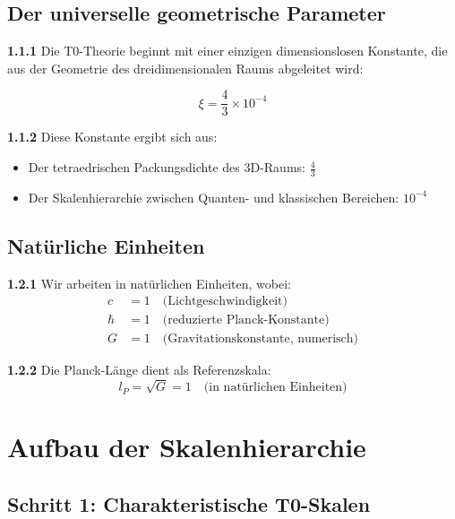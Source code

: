 \documentclass[12pt,a4paper]{article}
\newcommand{\lP}{l_P}
\newcommand{\xipar}{\xi}
\begin{document}
	\subsection{Der universelle geometrische Parameter}
	
	\noindent \textbf{1.1.1} Die T0-Theorie beginnt mit einer einzigen dimensionslosen Konstante, die aus der Geometrie des dreidimensionalen Raums abgeleitet wird:
	
	\begin{keyresult}
		\begin{equation}
			\boxed{\xipar = \frac{4}{3} \times 10^{-4}}
		\end{equation}
	\end{keyresult}
	
	\noindent \textbf{1.1.2} Diese Konstante ergibt sich aus:
	\begin{itemize}
		\item Der tetraedrischen Packungsdichte des 3D-Raums: $\frac{4}{3}$
		\item Der Skalenhierarchie zwischen Quanten- und klassischen Bereichen: $10^{-4}$
	\end{itemize}
	
	\subsection{Natürliche Einheiten}
	
	\noindent \textbf{1.2.1} Wir arbeiten in natürlichen Einheiten, wobei:
	\begin{align}
		c &= 1 \quad \text{(Lichtgeschwindigkeit)} \\
		\hbar &= 1 \quad \text{(reduzierte Planck-Konstante)} \\
		G &= 1 \quad \text{(Gravitationskonstante, numerisch)}
	\end{align}
	
	\noindent \textbf{1.2.2} Die Planck-Länge dient als Referenzskala:
	\begin{equation}
		\lP = \sqrt{G} = 1 \quad \text{(in natürlichen Einheiten)}
	\end{equation}
	
	\section{Aufbau der Skalenhierarchie}
	
	\subsection{Schritt 1: Charakteristische T0-Skalen}
	
\end{document}

